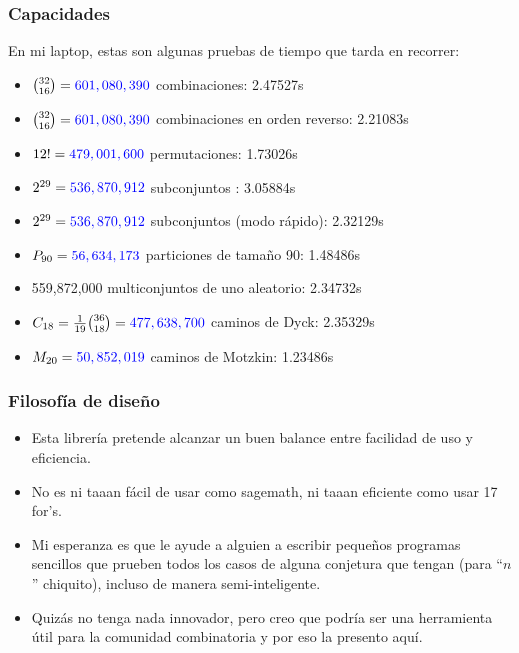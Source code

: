 \documentclass[spanish,professionalfonts]{beamer}
\def\tcr#1{\textcolor{MyRed}{#1}}
\def\tcb#1{\textcolor{MyBlue}{#1}}
\begin{document}
\begin{frame}\frametitle{Capacidades}
En mi laptop, estas son algunas pruebas de tiempo que tarda en recorrer: \pause
\begin{itemize}
  \item $\binom{32}{16} = \tcb{601,080,390}$ combinaciones: \tcr{2.47527s}
  \item $\binom{32}{16} = \tcb{601,080,390}$ combinaciones en orden reverso: \tcr{2.21083s}
  \item $12! = \tcb{479,001,600}$ permutaciones: \tcr{1.73026s}
  \item $2^{29} = \tcb{536,870,912}$ subconjuntos : \tcr{3.05884s}
  \item $2^{29} = \tcb{536,870,912}$ subconjuntos (modo rápido): \tcr{2.32129s}
  \item $P_{90} = \tcb{56,634,173}$ particiones de tamaño 90: \tcr{1.48486s}
  \item \tcb{559,872,000} multiconjuntos de uno aleatorio: \tcr{2.34732s}
  \item $C_{18} = \frac{1}{19}\binom{36}{18} = \tcb{477,638,700}$ caminos de Dyck: \tcr{2.35329s}
  \item $M_{20} = \tcb{50,852,019}$ caminos de Motzkin: \tcr{1.23486s}
\end{itemize}
\end{frame}


\begin{frame}\frametitle{Filosofía de diseño}
	\begin{itemize}
		\item Esta librería pretende alcanzar un buen balance entre facilidad de uso y eficiencia. \pause
		\item No es ni taaan fácil de usar como sagemath, ni taaan eficiente como usar 17 \tcb{for}'s. \pause
		\item Mi esperanza es que le ayude a alguien a escribir pequeños programas sencillos que prueben todos los casos de alguna conjetura que tengan (para ``$n$'' chiquito), incluso de manera semi-inteligente. \pause
		\item Quizás no tenga nada innovador, pero creo que podría ser una herramienta útil para la comunidad combinatoria y por eso la presento aquí.
	\end{itemize}
\end{frame}
\end{document}
